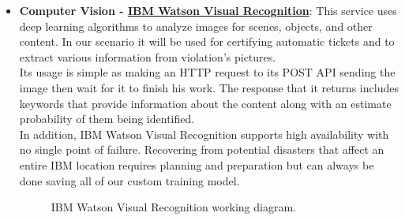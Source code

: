 \begin{itemize}
	\item \textbf{Computer Vision - \href{https://cloud.ibm.com/catalog/services/visual-recognition}{IBM Watson Visual Recognition}}: This service uses deep learning algorithms to analyze images for scenes, objects, and other content. In our scenario it will be used for certifying automatic tickets and to extract various information from violation's pictures.
	\\Its usage is simple as making an HTTP request to its POST API sending the image then wait for it to finish his work. The response that it returns includes keywords that provide information about the content along with an estimate probability of them being identified.
	\\In addition, IBM Watson Visual Recognition supports high availability with no single point of failure. Recovering from potential disasters that affect an entire IBM location requires planning and preparation but can always be done saving all of our custom training model.
	\begin{figure}[h!]
		\caption{IBM Watson Visual Recognition working diagram.}
	\end{figure}
	\FloatBarrier
	

\end{itemize}
